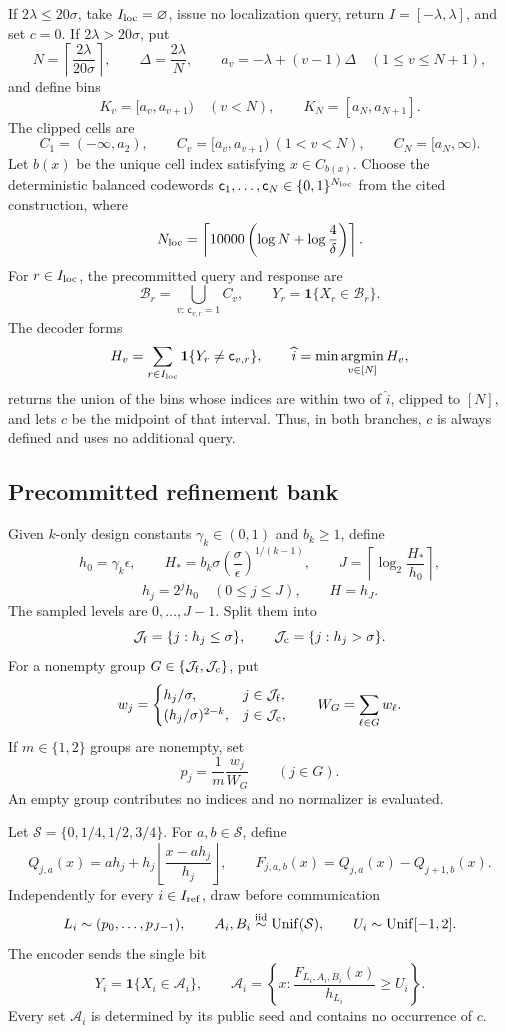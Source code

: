 If \(2\lambda\leq20\sigma\), take \(I_{\rm loc}=\varnothing\), issue no
localization query, return \(I=[-\lambda,\lambda]\), and set \(c=0\).  If
\(2\lambda>20\sigma\), put
\[
N=\left\lceil\frac{2\lambda}{20\sigma}\right\rceil,\qquad
\Delta=\frac{2\lambda}{N},\qquad
a_v=-\lambda+(v-1)\Delta\quad(1\leq v\leq N+1),
\]
and define bins
\[
K_v=[a_v,a_{v+1})\quad(v<N),\qquad K_N=[a_N,a_{N+1}].
\]
The clipped cells are
\[
C_1=(-\infty,a_2),\qquad
C_v=[a_v,a_{v+1})\ (1<v<N),\qquad
C_N=[a_N,\infty).
\]
Let \(b(x)\) be the unique cell index satisfying \(x\in C_{b(x)}\).  Choose
the deterministic balanced codewords
\(\mathsf c_1,\ldots,\mathsf c_N\in\{0,1\}^{N_{\rm loc}}\) from the cited
construction, where
\[
N_{\rm loc}
=\left\lceil10000\left(
\log N+\log\frac4\delta\right)\right\rceil.
\]
For \(r\in I_{\rm loc}\), the precommitted query and response are
\[
\mathcal B_r=\bigcup_{v:\,\mathsf c_{v,r}=1}C_v,\qquad
Y_r=\mathbf1\{X_r\in\mathcal B_r\}.
\]
The decoder forms
\[
H_v=\sum_{r\in I_{\rm loc}}\mathbf1\{Y_r\neq\mathsf c_{v,r}\},
\qquad
\widehat i=\min\operatorname*{argmin}_{v\in[N]}H_v,
\]
returns the union of the bins whose indices are within two of
\(\widehat i\), clipped to \([N]\), and lets \(c\) be the midpoint of that
interval.  Thus, in both branches, \(c\) is always defined and uses no
additional query.

\subsection{Precommitted refinement bank}

Given \(k\)-only design constants \(\gamma_k\in(0,1)\) and \(b_k\geq1\),
define
\[
h_0=\gamma_k\epsilon,\qquad
H_*=b_k\sigma\left(\frac{\sigma}{\epsilon}\right)^{1/(k-1)},\qquad
J=\left\lceil\log_2\frac{H_*}{h_0}\right\rceil,
\]
\[
h_j=2^jh_0\quad(0\leq j\leq J),\qquad H=h_J.
\]
The sampled levels are \(0,\ldots,J-1\).  Split them into
\[
\mathcal J_{\rm f}=\{j:h_j\leq\sigma\},\qquad
\mathcal J_{\rm c}=\{j:h_j>\sigma\}.
\]
For a nonempty group \(G\in\{\mathcal J_{\rm f},\mathcal J_{\rm c}\}\),
put
\[
w_j=
\begin{cases}
h_j/\sigma,&j\in\mathcal J_{\rm f},\\
(h_j/\sigma)^{2-k},&j\in\mathcal J_{\rm c},
\end{cases}
\qquad
W_G=\sum_{\ell\in G}w_\ell.
\]
If \(m\in\{1,2\}\) groups are nonempty, set
\[
p_j=\frac1m\frac{w_j}{W_G}\qquad(j\in G).
\]
An empty group contributes no indices and no normalizer is evaluated.

Let \(\mathcal S=\{0,1/4,1/2,3/4\}\).  For \(a,b\in\mathcal S\), define
\[
Q_{j,a}(x)
=a h_j+h_j\left\lfloor\frac{x-a h_j}{h_j}\right\rfloor,
\qquad
F_{j,a,b}(x)=Q_{j,a}(x)-Q_{j+1,b}(x).
\]
Independently for every \(i\in I_{\rm ref}\), draw before communication
\[
L_i\sim(p_0,\ldots,p_{J-1}),\qquad
A_i,B_i\mathrel{\stackrel{\rm iid}{\sim}}\operatorname{Unif}(\mathcal S),
\qquad
U_i\sim\operatorname{Unif}[-1,2].
\]
The encoder sends the single bit
\[
Y_i=\mathbf1\{X_i\in\mathcal A_i\},\qquad
\mathcal A_i=
\left\{x:\frac{F_{L_i,A_i,B_i}(x)}{h_{L_i}}\geq U_i\right\}.
\]
Every set \(\mathcal A_i\) is determined by its public seed and contains no
occurrence of \(c\).

